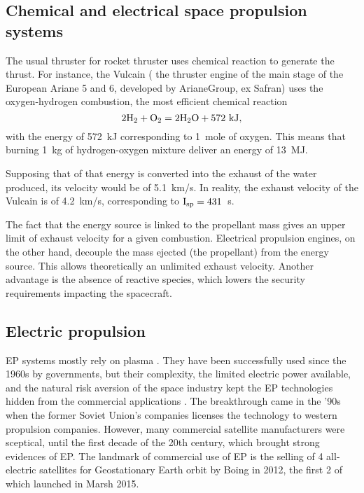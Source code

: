 \subsection*{Chemical and electrical space propulsion systems}
The usual thruster for rocket thruster uses chemical reaction to generate the thrust.
For instance, the Vulcain ( the thruster engine of the main stage of the European Ariane 5 and 6, developed by ArianeGroup, ex Safran) uses the oxygen-hydrogen combustion, the most efficient chemical reaction \citep{nasa-H2O2}
\begin{equation*}
  2 {\rm H_2} + { \rm O_2} = 2 {\rm H_2 O} + 572 \text{~kJ},
\end{equation*}
with the energy of 572~kJ corresponding to 1~mole of oxygen.
This means that burning 1~kg of hydrogen-oxygen mixture deliver an energy of 13~MJ. 

Supposing that of that energy is converted into the exhaust of the water produced, its velocity would be of 5.1~km/s.
In reality, the exhaust velocity of the Vulcain is of 4.2~km/s, corresponding to $\rm I_{\rm sp}=431$~s.

The fact that the energy source is linked to the propellant mass gives an upper limit of exhaust velocity for a given combustion.
Electrical propulsion engines, on the other hand, decouple the mass ejected (the propellant) from the energy source.
This allows theoretically an unlimited exhaust velocity.
Another advantage is the absence of reactive species, which lowers the security requirements impacting the spacecraft.

\subsection*{Electric propulsion} \label{subsec-label}
\ac{EP} systems mostly rely on plasma \citep{charles2009,mazouffre2016}.
They have been successfully used since the 1960s by governments, but their complexity, the limited electric power available, and the natural risk aversion of the space industry kept the \ac{EP} technologies hidden from the commercial applications \citep{lev2019}.
The breakthrough came in the '90s when the former Soviet Union's companies licenses the technology to western propulsion companies.
However, many commercial satellite manufacturers were sceptical, until the first decade of the 20th century, which brought strong evidences of \ac{EP}.
The landmark of commercial use of \ac{EP} is the selling of 4 all-electric satellites for Geostationary Earth orbit by Boing in 2012, the first 2 of which launched in Marsh 2015.

